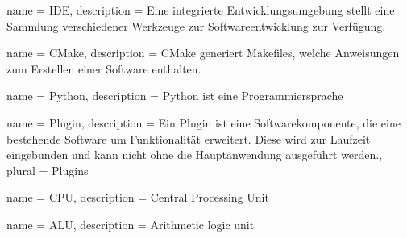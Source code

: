  {
    name = {IDE},
    description = {Eine integrierte Entwicklungsumgebung stellt eine Sammlung verschiedener Werkzeuge zur Softwareentwicklung zur Verfügung.}
}

 {
    name = {CMake},
    description = {CMake generiert Makefiles, welche Anweisungen zum Erstellen einer Software enthalten.}
}

 {
    name = {Python},
    description = {Python ist eine Programmiersprache}
}

 {
    name = {Plugin},
    description = {Ein Plugin ist eine Softwarekomponente, die eine bestehende Software um Funktionalität erweitert.
                   Diese wird zur Laufzeit eingebunden und kann nicht ohne die Hauptanwendung ausgeführt werden.},
    plural = {Plugins}
}

 {
    name = {CPU},
    description = {Central Processing Unit}
}

 {
    name = {ALU},
    description = {Arithmetic logic unit}
}
